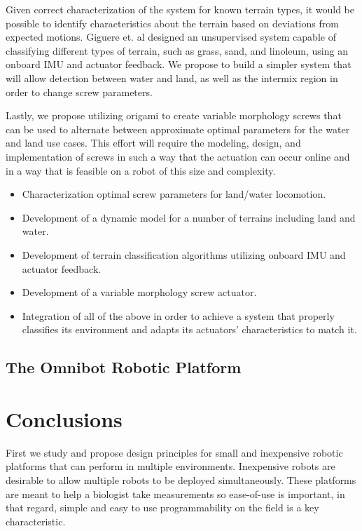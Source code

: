 Given correct characterization of the system for known terrain types, it would be possible to identify characteristics about the terrain based on deviations from expected motions. Giguere et. al \cite{Giguere2010} designed an unsupervised system capable of classifying different types of terrain, such as grass, sand, and linoleum, using an onboard IMU and actuator feedback. We propose to build a simpler system that will allow detection between water and land, as well as the intermix region in order to change screw parameters. 

Lastly, we propose utilizing origami to create variable morphology screws that can be used to alternate between approximate optimal parameters for the water and land use cases. This effort will require the modeling, design, and implementation of screws in such a way that the actuation can occur online and in a way that is feasible on a robot of this size and complexity. 

\begin{itemize}
	\item Characterization optimal screw parameters for land/water locomotion.
	\item Development of a dynamic model for a number of terrains including land and water.
	\item Development of terrain classification algorithms utilizing onboard IMU and actuator feedback. 
	\item Development of a variable morphology screw actuator. 
	\item Integration of all of the above in order to achieve a system that properly classifies its environment and adapts its actuators' characteristics to match it. 
\end{itemize}

\subsection{The Omnibot Robotic Platform}
\label{sec:omnibot}


\section{Conclusions}
\label{sec:conclusions}

First we study and propose design principles for small and inexpensive robotic platforms that can perform in multiple environments. Inexpensive robots are desirable to allow multiple robots to be deployed simultaneously. These platforms are meant to help a biologist take measurements so ease-of-use is important, in that regard, simple and easy to use programmability on the field is a key characteristic. 

